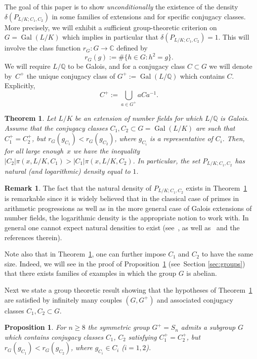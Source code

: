 \documentclass[JEP,XML,SOM,Unicode,NoEqCountersInSection,NoFloatCountersInSection,published]{cedram}
\newtheorem{proposition}[X]{Proposition}
\newtheorem{theorem}[X]{Theorem}
\theoremstyle{definition}
\newtheorem*{remark*}{Remark}
\DeclareMathOperator{\Gal}{Gal}
\newcommand{\Q}{\mathbb Q}
\begin{document}
The goal of this paper is to show \emph{unconditionally} the existence of the density $\delta(P_{L/K;C_1,C_2})$ in some families of
extensions and for specific conjugacy classes.
More precisely, we will exhibit a sufficient group-theoretic criterion on $G=\Gal(L/K)$ which implies in particular that $\delta(P_{L/K;C_1,C_2})=1$.
This will involve the class function $r_G:G\to \mathbb C$ defined by
\[ r_G(g) := \# \{ h\in G \colon h^2=g\}.\]
We will require $L/\Q$ to be Galois, and for a conjugacy class $C\subset G$ we will denote by~$C^+$ the unique conjugacy class of $G^+:=\Gal(L/\Q)$ which contains $C$. Explicitly,
\begin{equation}
C^+:=\bigcup_{a\in G^+} a C a^{-1}.
\label{equation definition C+}
\end{equation}

\begin{theorem}
\label{theorem main}
Let $L/K$ be an extension of number fields for which $L/\Q$ is \hbox{Galois}. Assume that the conjugacy classes $C_1,C_2\subset G=\Gal(L/K)$ are such that \hbox{$C_1^+=C_2^+$}, but $ r_G(g_{C_1}) < r_G(g_{C_2}) $, where $g_{C_i}$ is a representative of $C_i$. Then, for all large enough~$x$ we have the inequality $ |C_2|\pi(x,L/K,C_1) >|C_1| \pi(x,L/K,C_2) $. In particular, the set $P_{L/K;C_1,C_2}$ has natural (and logarithmic) density equal to $1$.
\end{theorem}

\begin{remark*}
The fact that the natural density of $P_{L/K;C_1,C_2}$ exists in Theorem~\ref{theorem main} is remarkable since it is widely believed that in the classical case of primes in arithmetic progressions as well as in the more general case of Galois extensions of number fields, the logarithmic density is the appropriate notion to work with. In general one cannot expect natural densities to exist
(see~\cite{Ka}, as well as~\cite[p.\,174]{RS} and the references therein).

Note also that in Theorem~\ref{theorem main}, one can further impose $C_1$ and $C_2$ to have the same size. Indeed, we will see in the proof of Proposition~\ref{proposition main} (see~Section \ref{sec:groups}) that there exists families of examples in which the group $G$ is abelian.
\end{remark*}

Next we state a group theoretic result showing that the hypotheses of Theorem~\ref{theorem main} are satisfied by infinitely many couples $(G,G^+)$ and associated conjugacy classes $C_1,C_2 \subset G$.
\begin{proposition}
\label{proposition main}
For $n\geq 8$ the symmetric group $G^+=S_n$ admits a subgroup $G$ which contains conjugacy classes $C_1$, $C_2$ satisfying $C_1^+=C_2^+$, but $ r_G(g_{C_1}) < r_G(g_{C_2}) $, where $g_{C_i}\in C_i$ ($i=1,2$).
\end{proposition}
\end{document}
